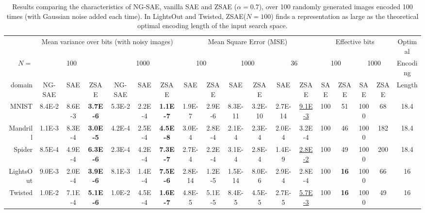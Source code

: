 \begin{table}[tbp]
 \centering
 \setlength{\tabcolsep}{0.25em}
 \begin{tabular}{|r|*{17}{c|}}
       & \multicolumn{6}{c|}{Mean variance over bits (with noisy images)}
       & \multicolumn{6}{c|}{Mean Square Error (MSE)}
       & \multicolumn{4}{c|}{Effective bits}
       & Optimal
  \\
$N=$ & \multicolumn{3}{c|}{100} & \multicolumn{3}{c|}{1000}
     & \multicolumn{2}{c|}{100} & \multicolumn{2}{c|}{1000} & \multicolumn{2}{c|}{36}
     & \multicolumn{2}{c|}{100} & \multicolumn{2}{c|}{1000}
  & Encoding
  \\
domain    & NG-SAE & SAE    & ZSAE            & NG-SAE & SAE    & ZSAE            & SAE     & ZSAE  & SAE    & ZSAE   & SAE    & ZSAE          & SAE & ZSAE        & SAE  & ZSAE & Length \\ 
MNIST     & 8.4E-2 & 8.6E-3 & \textbf{3.7E-6} & 5.3E-2 & 2.2E-4 & \textbf{1.1E-7} & 1.9E-7  &2.9E-6 &8.3E-11 &3.2E-10 &2.7E-14 &\uline{9.1E-3} & 100 & 51          & 1000 & 68   & 18.4   \\ 
Mandrill  & 1.1E-3 & 8.3E-4 & \textbf{3.0E-5} & 4.2E-4 & 2.5E-4 & \textbf{4.5E-8} & 3.0E-4  &2.8E-4 &2.1E-4  &2.3E-4  &2.0E-4  &{3.2E-4}       & 100 & 46          & 1000 & 182  & 18.4   \\ 
Spider    & 8.5E-4 & 4.9E-4 & \textbf{6.3E-6} & 2.3E-4 & 4.2E-4 & \textbf{7.3E-7} & 2.7E-4  &2.2E-4 &3.1E-4  &2.8E-4  &1.4E-9  &\uline{2.8E-2} & 100 & 49          & 1000 & 200  & 18.4   \\ 
LightsOut & 9.0E-3 & 2.0E-4 & \textbf{3.9E-6} & 8.1E-3 & 1.4E-4 & \textbf{7.5E-6} & 2.8E-14 &1.2E-5 &1.5E-14 &8.0E-6  &2.9E-4  &{2.8E-4}       & 100 & \textbf{16} & 1000 & 66   & 16     \\ 
Twisted   & 1.0E-2 & 7.1E-4 & \textbf{5.1E-6} & 1.0E-2 & 4.5E-4 & \textbf{1.6E-7} & 4.8E-5  &5.1E-5 &8.4E-5  &4.5E-5  &2.7E-5  &\uline{5.7E-3} & 100 & \textbf{16} & 1000 & 49   & 16     \\ 
\end{tabular}
 \caption{Results comparing the characteristics of NG-SAE, vanilla SAE and ZSAE ($\alpha=0.7$),
 over 100 randomly generated images encoded 100 times (with Gaussian noise added each time).
 In LightsOut and Twisted, ZSAE($N=100$) finds a representation as large as the theoretical optimal encoding length of the input search space.
 }
\label{tab:stability}
\end{table}

